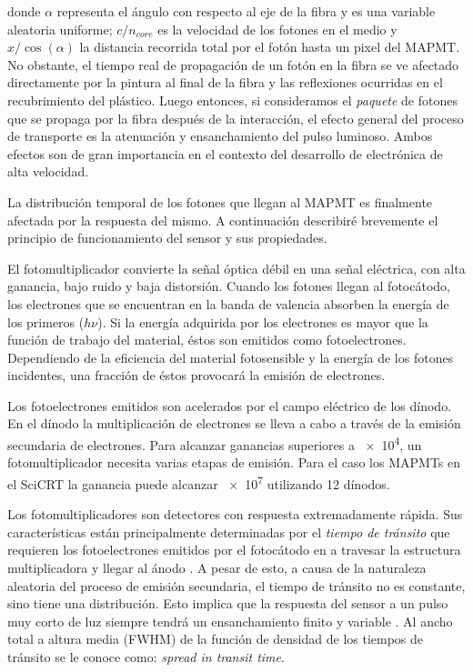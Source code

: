 donde $\alpha$ representa el ángulo con respecto al eje de la fibra y es una variable aleatoria uniforme; $c/n_{core}$ es la velocidad de los fotones en el medio y $x/\cos(\alpha)$ la distancia recorrida total por el fotón hasta un pixel del MAPMT. No obstante, el tiempo real de propagación de un fotón en la fibra se ve afectado directamente por la pintura al final de la fibra y las reflexiones ocurridas en el recubrimiento del plástico. Luego entonces, si consideramos el \emph{paquete} de fotones que se propaga por la fibra después de la interacción, el efecto general del proceso de transporte es la atenuación y ensanchamiento del pulso luminoso. Ambos efectos son de gran importancia en el contexto del desarrollo de electrónica de alta velocidad.

La distribución temporal de los fotones que llegan al MAPMT es finalmente afectada por la respuesta del mismo. A continuación describiré brevemente el principio de funcionamiento del sensor y sus propiedades.

El fotomultiplicador convierte la señal óptica débil en una señal eléctrica, con alta ganancia, bajo ruido y baja distorsión. Cuando los fotones llegan al fotocátodo, los electrones que se encuentran en la banda de valencia absorben la energía de los primeros ($h\nu$). Si la energía adquirida por los electrones es mayor que la función de trabajo del material, éstos son emitidos como fotoelectrones. Dependiendo de la eficiencia del material fotosensible y la energía de los fotones incidentes, una fracción de éstos provocará la emisión de electrones.

Los fotoelectrones emitidos son acelerados por el campo eléctrico de los dínodo. En el dínodo la multiplicación de electrones se lleva a cabo a través de la emisión secundaria de electrones. Para alcanzar ganancias superiores a \num{e4}, un fotomultiplicador necesita varias etapas de emisión. Para el caso los MAPMTs en el SciCRT la ganancia puede alcanzar \num{e7} utilizando \num{12} dínodos.

Los fotomultiplicadores son detectores con respuesta extremadamente rápida. Sus características están principalmente determinadas por el \emph{tiempo de tránsito} que requieren los fotoelectrones emitidos por el fotocátodo en a travesar la estructura multiplicadora y llegar al ánodo \cite{hama07}. A pesar de esto, a causa de la naturaleza aleatoria del proceso de emisión secundaria, el tiempo de tránsito no es constante, sino tiene una distribución. Esto implica que la respuesta del sensor a un pulso muy corto de luz siempre tendrá un ensanchamiento finito y variable \cite{syed07}. Al ancho total a altura media (FWHM) de la función de densidad de los tiempos de tránsito se le conoce como: \emph{spread in transit time}.

